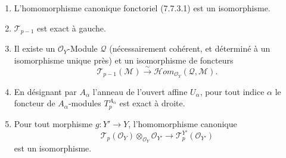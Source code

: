 \begin{theorem}[7.7.5]
\begin{enumerate}
  \item[\textup{a$''$)}] L'homomorphisme canonique fonctoriel (7.7.3.1) est un
    isomorphisme.

  \item[\textup{b)}] $\mathscr T_{p-1}$ est exact à gauche.

  \item[\textup{b$'$)}] Il existe un $\mathscr O_Y$-Module $\mathscr Q$ (nécessairement
    cohérent, et déterminé à un isomorphisme unique près) et un isomorphisme de
    foncteurs
    \[
      \mathscr T_{p-1}(\mathscr M)
      \xrightarrow{\sim}
      \mathscr{H}\!om_{\mathscr O_Y}(\mathscr Q,\mathscr M).
      \tag{7.7.5.2}\label{III.7.7.5.2.fr}
    \]

  \item[\textup{c)}] En désignant par $A_\alpha$ l'anneau de l'ouvert affine $U_\alpha$,
    pour tout indice $\alpha$ le foncteur de $A_\alpha$-modules
    $T_p^{A_\alpha}$ est exact à droite.

  \item[\textup{d)}] Pour tout morphisme $g:Y'\to Y$, l'homomorphisme canonique
    \[
      \mathscr T_p(\mathscr O_Y)
      \otimes_{\mathscr O_Y}\mathscr O_{Y'}
      \longrightarrow
      \mathscr T_p^{Y'}(\mathscr O_{Y'})
      \tag{7.7.5.3}\label{III.7.7.5.3.fr}
    \]
    est un isomorphisme.
\end{enumerate}
\end{theorem}

